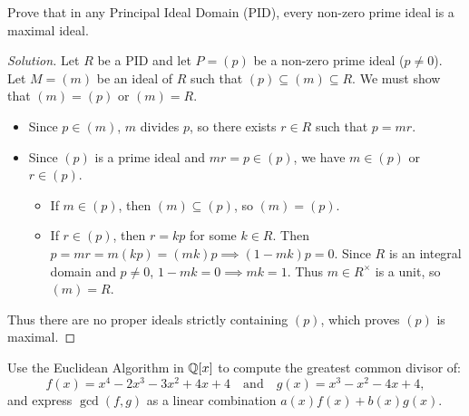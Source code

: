 \begin{problem}
Prove that in any Principal Ideal Domain (PID), every non-zero prime ideal is a maximal ideal.
\end{problem}

\begin{proof}[Solution]
Let $R$ be a PID and let $P = (p)$ be a non-zero prime ideal ($p \ne 0$).
Let $M = (m)$ be an ideal of $R$ such that $(p) \subseteq (m) \subseteq R$.
We must show that $(m) = (p)$ or $(m) = R$.
\begin{itemize}[leftmargin=1.5em, itemsep=4pt]
    \item Since $p \in (m)$, $m$ divides $p$, so there exists $r \in R$ such that $p = mr$.
    \item Since $(p)$ is a prime ideal and $mr = p \in (p)$, we have $m \in (p)$ or $r \in (p)$.
    \begin{itemize}[leftmargin=1.5em, itemsep=3pt]
        \item If $m \in (p)$, then $(m) \subseteq (p)$, so $(m) = (p)$.
        \item If $r \in (p)$, then $r = kp$ for some $k \in R$.
        Then $p = mr = m(kp) = (mk)p \implies (1 - mk)p = 0$.
        Since $R$ is an integral domain and $p \ne 0$, $1 - mk = 0 \implies mk = 1$.
        Thus $m \in R^\times$ is a unit, so $(m) = R$.
    \end{itemize}
\end{itemize}
Thus there are no proper ideals strictly containing $(p)$, which proves $(p)$ is maximal.
\end{proof}

\begin{problem}
Use the Euclidean Algorithm in $\mathbb{Q}[x]$ to compute the greatest common divisor of:
\begin{equation}
f(x) = x^4 - 2x^3 - 3x^2 + 4x + 4 \quad \text{and} \quad g(x) = x^3 - x^2 - 4x + 4,
\end{equation}
and express $\gcd(f, g)$ as a linear combination $a(x)f(x) + b(x)g(x)$.
\end{problem}

